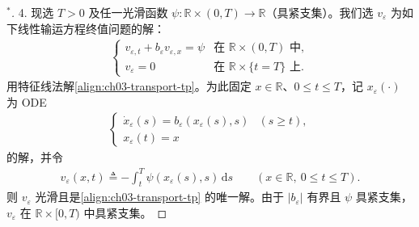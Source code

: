 \documentclass[../../main.tex]{subfiles}
\begin{document}
\begin{proof}[$^*$]
4. 现选 $T>0$ 及任一光滑函数 $\psi:\mathbb{R}\times(0,T)\to\mathbb{R}$（具紧支集）。我们选 $v_\varepsilon$ 为如下线性输运方程终值问题的解：
\begin{align}\label{align:ch03-transport-tp}
\begin{cases}
v_{\varepsilon,t}+b_\varepsilon v_{\varepsilon,x}=\psi & \text{在 }\mathbb{R}\times(0,T)\text{ 中},\\
v_\varepsilon=0 & \text{在 }\mathbb{R}\times\{t=T\}\text{ 上}.
\end{cases}
\end{align}
用特征线法解\eqref{align:ch03-transport-tp}。为此固定 $x\in\mathbb{R}$、$0\leqslant t\leqslant T$，记 $x_\varepsilon(\cdot)$ 为 ODE
\begin{align}\label{align:ch03-char-ode}
\begin{cases}
\dot{x}_\varepsilon(s)=b_\varepsilon(x_\varepsilon(s),s) & (s\geqslant t),\\
x_\varepsilon(t)=x
\end{cases}
\end{align}
的解，并令
\begin{align}\label{align:ch03-veps}
v_\varepsilon(x,t)\triangleq-\int_t^T\psi(x_\varepsilon(s),s)\,\mathrm{d}s \qquad(x\in\mathbb{R},\ 0\leqslant t\leqslant T).
\end{align}
则 $v_\varepsilon$ 光滑且是\eqref{align:ch03-transport-tp} 的唯一解。由于 $|b_\varepsilon|$ 有界且 $\psi$ 具紧支集，$v_\varepsilon$ 在 $\mathbb{R}\times[0,T)$ 中具紧支集。


\end{proof}
\end{document}
